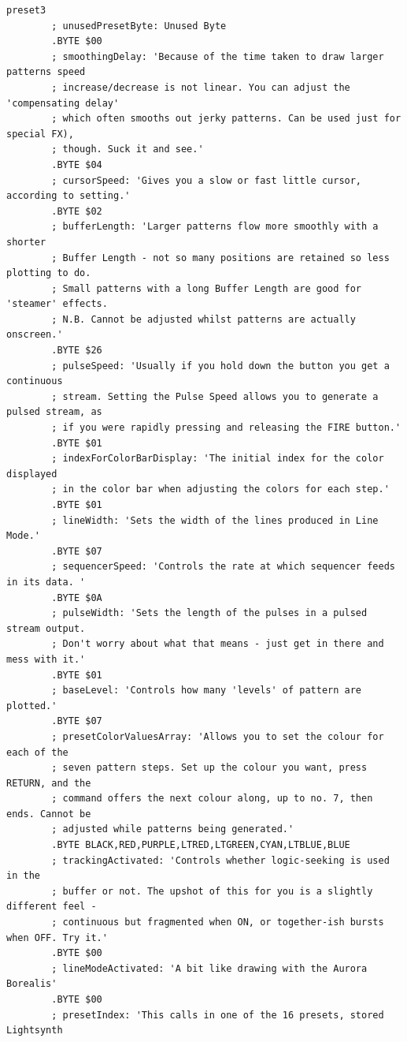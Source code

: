 \begin{lstlisting}[basicstyle=\ttfamily\tiny,caption=Source code for Preset 3.]
preset3
        ; unusedPresetByte: Unused Byte
        .BYTE $00
        ; smoothingDelay: 'Because of the time taken to draw larger patterns speed
        ; increase/decrease is not linear. You can adjust the 'compensating delay'
        ; which often smooths out jerky patterns. Can be used just for special FX),
        ; though. Suck it and see.'
        .BYTE $04
        ; cursorSpeed: 'Gives you a slow or fast little cursor, according to setting.'
        .BYTE $02
        ; bufferLength: 'Larger patterns flow more smoothly with a shorter
        ; Buffer Length - not so many positions are retained so less plotting to do.
        ; Small patterns with a long Buffer Length are good for 'steamer' effects.
        ; N.B. Cannot be adjusted whilst patterns are actually onscreen.'
        .BYTE $26
        ; pulseSpeed: 'Usually if you hold down the button you get a continuous
        ; stream. Setting the Pulse Speed allows you to generate a pulsed stream, as
        ; if you were rapidly pressing and releasing the FIRE button.'
        .BYTE $01
        ; indexForColorBarDisplay: 'The initial index for the color displayed
        ; in the color bar when adjusting the colors for each step.'
        .BYTE $01
        ; lineWidth: 'Sets the width of the lines produced in Line Mode.'
        .BYTE $07
        ; sequencerSpeed: 'Controls the rate at which sequencer feeds in its data. '
        .BYTE $0A
        ; pulseWidth: 'Sets the length of the pulses in a pulsed stream output.
        ; Don't worry about what that means - just get in there and mess with it.'
        .BYTE $01
        ; baseLevel: 'Controls how many 'levels' of pattern are plotted.'
        .BYTE $07
        ; presetColorValuesArray: 'Allows you to set the colour for each of the
        ; seven pattern steps. Set up the colour you want, press RETURN, and the
        ; command offers the next colour along, up to no. 7, then ends. Cannot be
        ; adjusted while patterns being generated.'
        .BYTE BLACK,RED,PURPLE,LTRED,LTGREEN,CYAN,LTBLUE,BLUE
        ; trackingActivated: 'Controls whether logic-seeking is used in the
        ; buffer or not. The upshot of this for you is a slightly different feel -
        ; continuous but fragmented when ON, or together-ish bursts when OFF. Try it.'
        .BYTE $00
        ; lineModeActivated: 'A bit like drawing with the Aurora Borealis'
        .BYTE $00
        ; presetIndex: 'This calls in one of the 16 presets, stored Lightsynth

\end{lstlisting}
